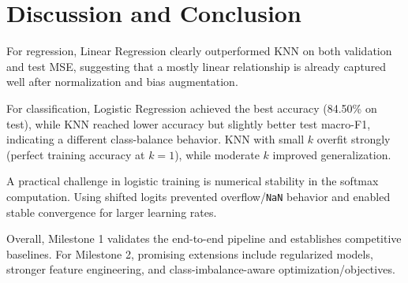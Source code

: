 \documentclass[10pt, twocolumn, letterpaper]{article}
\begin{document}
\section{Discussion and Conclusion}
For regression, Linear Regression clearly outperformed KNN on both validation and test MSE, suggesting that a mostly linear relationship is already captured well after normalization and bias augmentation.

For classification, Logistic Regression achieved the best accuracy (84.50\% on test), while KNN reached lower accuracy but slightly better test macro-F1, indicating a different class-balance behavior. KNN with small $k$ overfit strongly (perfect training accuracy at $k=1$), while moderate $k$ improved generalization.

A practical challenge in logistic training is numerical stability in the softmax computation. Using shifted logits prevented overflow/\texttt{NaN} behavior and enabled stable convergence for larger learning rates.

Overall, Milestone 1 validates the end-to-end pipeline and establishes competitive baselines. For Milestone 2, promising extensions include regularized models, stronger feature engineering, and class-imbalance-aware optimization/objectives.
\end{document}
